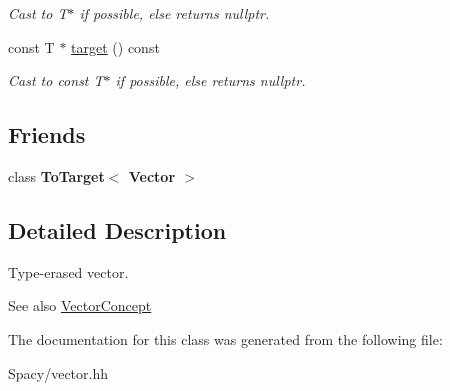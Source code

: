 \begin{DoxyCompactItemize}
\begin{DoxyCompactList}\small\item\em Cast to T$\ast$ if possible, else returns nullptr. \end{DoxyCompactList}\item 
\hypertarget{structSpacy_1_1Mixin_1_1ToTarget_a98985b22f6fc98d253c8416c54a5e359}{}const T $\ast$ \hyperlink{structSpacy_1_1Mixin_1_1ToTarget_a98985b22f6fc98d253c8416c54a5e359}{target} () const\label{structSpacy_1_1Mixin_1_1ToTarget_a98985b22f6fc98d253c8416c54a5e359}

\begin{DoxyCompactList}\small\item\em Cast to const T$\ast$ if possible, else returns nullptr. \end{DoxyCompactList}\end{DoxyCompactItemize}
\subsection*{Friends}
\begin{DoxyCompactItemize}
\item 
\hypertarget{classSpacy_1_1Vector_a8acabf8da8eb9b39c88a68493002d288}{}class {\bfseries To\+Target$<$ Vector $>$}\label{classSpacy_1_1Vector_a8acabf8da8eb9b39c88a68493002d288}

\end{DoxyCompactItemize}


\subsection{Detailed Description}
Type-\/erased vector. 

\begin{DoxySeeAlso}{See also}
\hyperlink{group__ConceptGroup_gac8fbeed0f838941e90ebe635a546e1db}{Vector\+Concept} 
\end{DoxySeeAlso}


The documentation for this class was generated from the following file\+:\begin{DoxyCompactItemize}
\item 
Spacy/vector.\+hh\end{DoxyCompactItemize}

